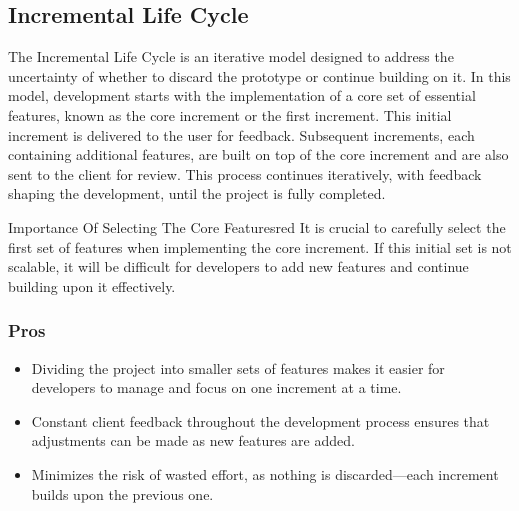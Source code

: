 \vspace{1cm}
\subsection{Incremental Life Cycle}
The Incremental Life Cycle is an iterative model designed to address the uncertainty of whether to discard the prototype or
continue building on it. 
In this model, development starts with the implementation of a core set of essential features, known as the core increment or
the first increment. This initial increment is delivered to the user for feedback. 
Subsequent increments, each containing additional features, are built on top of the core increment and are also sent to the 
client for review. This process continues iteratively, with feedback shaping the development, until the project is fully completed.

\vspace{0.5cm}

\begin{prettyBox}{Importance Of Selecting The Core Features}{red}
    It is crucial to carefully select the first set of features when implementing the core increment. If this initial set
    is not scalable, it will be difficult for developers to add new features and continue building upon it effectively.
\end{prettyBox}

\vspace{2cm}
\begin{center}
\end{center}

\subsubsection{Pros}
\begin{itemize}
    \item Dividing the project into smaller sets of features makes it easier for developers to manage and focus on one
increment at a time.
    \item Constant client feedback throughout the development process ensures that adjustments can be made as new
features are added.
    \item Minimizes the risk of wasted effort, as nothing is discarded—each increment builds upon the previous one.
\end{itemize}


